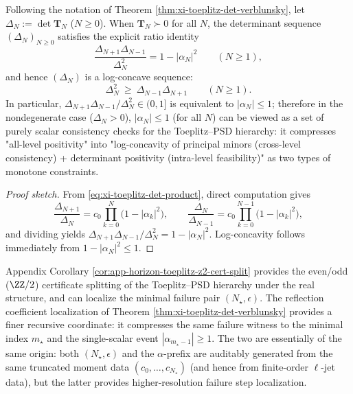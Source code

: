 \begin{corollary}\label{cor:xi-toeplitz-principal-minor-logconcavity}
Following the notation of Theorem \ref{thm:xi-toeplitz-det-verblunsky}, let \(\Delta_N:=\det\mathbf{T}_N\) (\(N\ge 0\)).
When \(\mathbf{T}_N\succ 0\) for all \(N\), the determinant sequence \((\Delta_N)_{N\ge 0}\) satisfies the explicit ratio identity
\[
\boxed{\;
\frac{\Delta_{N+1}\Delta_{N-1}}{\Delta_N^{2}}=1-|\alpha_N|^2\qquad(N\ge 1),\;}
\]
and hence \((\Delta_N)\) is a log-concave sequence:
\[
\boxed{\;
\Delta_N^2\ \ge\ \Delta_{N-1}\Delta_{N+1}\qquad(N\ge 1).\;}
\]
In particular, \(\Delta_{N+1}\Delta_{N-1}/\Delta_N^2\in(0,1]\) is equivalent to \(|\alpha_N|\le 1\);
therefore in the nondegenerate case (\(\Delta_N>0\)), \(|\alpha_N|\le 1\) (for all \(N\)) can be viewed as a set of purely scalar consistency checks for the Toeplitz--PSD hierarchy:
it compresses "all-level positivity" into "log-concavity of principal minors (cross-level consistency) + determinant positivity (intra-level feasibility)" as two types of monotone constraints.
\end{corollary}
\begin{proof}[Proof sketch]
From \eqref{eq:xi-toeplitz-det-product}, direct computation gives
\[
\frac{\Delta_{N+1}}{\Delta_N}
=c_0\prod_{k=0}^{N}\bigl(1-|\alpha_k|^2\bigr),
\qquad
\frac{\Delta_{N}}{\Delta_{N-1}}
=c_0\prod_{k=0}^{N-1}\bigl(1-|\alpha_k|^2\bigr),
\]
and dividing yields \(\Delta_{N+1}\Delta_{N-1}/\Delta_N^2=1-|\alpha_N|^2\).
Log-concavity follows immediately from \(1-|\alpha_N|^2\le 1\).
\end{proof}

\begin{remark}\label{rem:xi-verblunsky-z2-compatible}
Appendix Corollary \ref{cor:app-horizon-toeplitz-z2-cert-split} provides the even/odd (\(\ZZ/2\)) certificate splitting of the Toeplitz--PSD hierarchy under the real structure, and can localize the minimal failure pair \((N_\star,\epsilon)\).
The reflection coefficient localization of Theorem \ref{thm:xi-toeplitz-det-verblunsky} provides a finer recursive coordinate: it compresses the same failure witness to the minimal index \(m_\star\) and the single-scalar event \(|\alpha_{m_\star-1}|\ge 1\).
The two are essentially of the same origin: both \((N_\star,\epsilon)\) and the \(\alpha\)-prefix are auditably generated from the same truncated moment data \((c_0,\dots,c_{N_\star})\) (and hence from finite-order \(\ell\)-jet data), but the latter provides higher-resolution failure step localization.
\end{remark}

